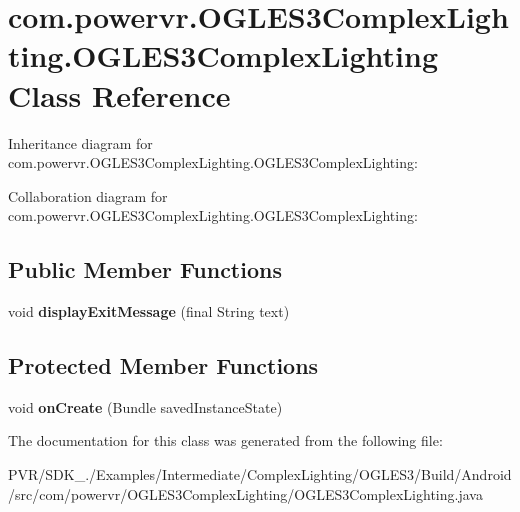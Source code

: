 \hypertarget{classcom_1_1powervr_1_1_o_g_l_e_s3_complex_lighting_1_1_o_g_l_e_s3_complex_lighting}{\section{com.\+powervr.\+O\+G\+L\+E\+S3\+Complex\+Lighting.\+O\+G\+L\+E\+S3\+Complex\+Lighting Class Reference}
\label{classcom_1_1powervr_1_1_o_g_l_e_s3_complex_lighting_1_1_o_g_l_e_s3_complex_lighting}
}


Inheritance diagram for com.\+powervr.\+O\+G\+L\+E\+S3\+Complex\+Lighting.\+O\+G\+L\+E\+S3\+Complex\+Lighting\+:


Collaboration diagram for com.\+powervr.\+O\+G\+L\+E\+S3\+Complex\+Lighting.\+O\+G\+L\+E\+S3\+Complex\+Lighting\+:
\subsection*{Public Member Functions}
\begin{DoxyCompactItemize}
\item 
\hypertarget{classcom_1_1powervr_1_1_o_g_l_e_s3_complex_lighting_1_1_o_g_l_e_s3_complex_lighting_a5bb8d4b6d5145786da23c3a2a70bc0e3}{void {\bfseries display\+Exit\+Message} (final String text)}\label{classcom_1_1powervr_1_1_o_g_l_e_s3_complex_lighting_1_1_o_g_l_e_s3_complex_lighting_a5bb8d4b6d5145786da23c3a2a70bc0e3}

\end{DoxyCompactItemize}
\subsection*{Protected Member Functions}
\begin{DoxyCompactItemize}
\item 
\hypertarget{classcom_1_1powervr_1_1_o_g_l_e_s3_complex_lighting_1_1_o_g_l_e_s3_complex_lighting_a08e9986c4ee6aed0a321968ee6951dba}{void {\bfseries on\+Create} (Bundle saved\+Instance\+State)}\label{classcom_1_1powervr_1_1_o_g_l_e_s3_complex_lighting_1_1_o_g_l_e_s3_complex_lighting_a08e9986c4ee6aed0a321968ee6951dba}

\end{DoxyCompactItemize}


The documentation for this class was generated from the following file\+:\begin{DoxyCompactItemize}
\item 
P\+V\+R/\+S\+D\+K\+\_./\+Examples/\+Intermediate/\+Complex\+Lighting/\+O\+G\+L\+E\+S3/\+Build/\+Android/src/com/powervr/\+O\+G\+L\+E\+S3\+Complex\+Lighting/O\+G\+L\+E\+S3\+Complex\+Lighting.\+java\end{DoxyCompactItemize}
